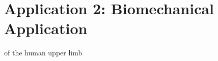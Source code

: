 
\chapter{Application 2: Biomechanical Application}

of the human upper limb
\blindtext{}





\cleardoublepage
